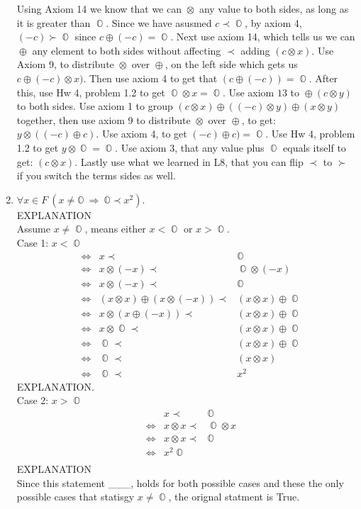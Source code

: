 \documentclass[11pt]{article}
\numberwithin{equation}{section}
\DeclareMathOperator*{\OO}{\mathbb{O}}
\DeclareMathOperator*{\+}{\oplus}
\DeclareMathOperator*{\x}{\otimes}
\DeclareMathOperator*{\fl}{\prec} %
\DeclareMathOperator*{\fg}{\succ} %
\DeclareMathOperator*{\Lra}{\Leftrightarrow}
\begin{document}
\begin{enumerate}[label= 1.\arabic*, itemsep=0.2cm]
       Using Axiom 14 we know that we can $\x$ any value to both sides, as long as it is greater than $\OO$. Since we have asusmed $c \fl \OO$, by axiom 4, $(-c) \fg \OO$ since $c \+ (-c) = \OO$. Next use axiom 14, which tells us we can $\+$ any element to both sides without affecting $\fl$ adding $(c \x x)$. Use Axiom 9, to distribute $\x$ over $\+$, on the left side which gets us $c \+ (-c) \x x)$. Then use axiom 4 to get that $(c \+ (-c))= \OO$. After this, use Hw 4, problem 1.2 to get $\OO \x x = \OO$. Use axiom $13$ to $\+ (c\x y)$ to  both sides. Use axiom 1 to group $(c \x x) \+ ((-c) \x y) \+ (x \x y)$ together, then use axiom 9 to distribute $\x$ over $\+$, to get: $y \x ((-c) \+ c)$. Use axiom 4, to get $(-c)\+ c) = \OO$. Use Hw 4, problem 1.2 to get $y \x \OO = \OO$. Use axiom 3, that any value plus $\OO$ equals itself to get: $(c \x x)$. Lastly use what we learned in L8, that you can flip $\fl$ to $\fg$ if you switch the terms sides as well. 
       
        
     \newpage
     \item %
     $\forall x \in F \ (x \neq \mathbb{O} \ \Rightarrow \ \mathbb{O} \prec x^2 )$. \\
      EXPLANATION\\
      Assume $x \neq \OO$, means either $x < \OO$ or $x > \OO$.\\
      Case 1: $x < \OO$
      \begin{align*}
        &\Lra& x \fl& \OO \\ 
        &\Lra& x\x (-x) \fl&  \OO \x (-x) \\ %
        &\Lra& x \x (-x)  \fl& \OO \\ %
        &\Lra& (x \x x) \+ (x \x (-x)) \fl& (x \x x) \+ \OO \\%
        &\Lra& x \x (x \+ (-x)) \fl& (x \x x) \+ \OO \\ %
        &\Lra& x \x \OO \fl& (x \x x) \+ \OO \\ %
        &\Lra& \OO \fl& (x \x x) \+ \OO \\ %
        &\Lra& \OO \fl& (x \x x) \\ %
        &\Lra& \OO \fl& x^2 %
      \end{align*}
      EXPLANATION.\\
      Case 2: $x > \OO$
      \begin{align*}
        && x \fl& \OO \\
        &\Lra& x \x x \fl& \OO \x x \\ %
        &\Lra& x \x x \fl& \OO \\ %
        &\Lra& x^2 \OO \\%
      \end{align*}
      EXPLANATION
      \smallskip\\
      Since this statement \_\_\_, holds for both possible cases and these the only possible cases that statisgy $x \neq \OO$, the orignal statment is True. 


\end{enumerate}
\end{document}
